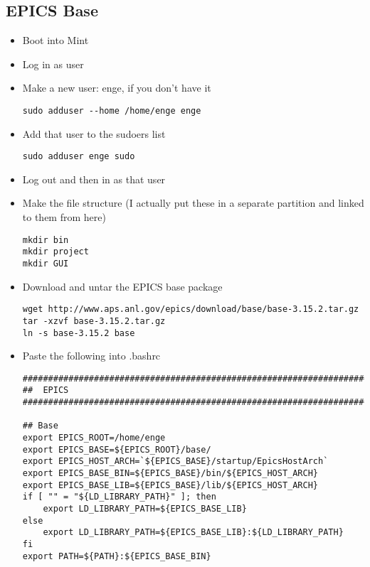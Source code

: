 \documentclass[11pt]{article}
\begin{document}
\subsection{EPICS Base}
\label{sec-1-2}
\begin{itemize}
\item Boot into Mint
\item Log in as user
\item Make a new user: enge, if you don't have it
\begin{verbatim}
sudo adduser --home /home/enge enge
\end{verbatim}
\item Add that user to the sudoers list
\begin{verbatim}
sudo adduser enge sudo
\end{verbatim}
\item Log out and then in as that user
\item Make the file structure (I actually put these in a separate
partition and linked to them from here)
\begin{verbatim}
mkdir bin
mkdir project
mkdir GUI
\end{verbatim}
\item Download and untar the EPICS base package
\begin{verbatim}
wget http://www.aps.anl.gov/epics/download/base/base-3.15.2.tar.gz 
tar -xzvf base-3.15.2.tar.gz
ln -s base-3.15.2 base
\end{verbatim}
\item Paste the following into .bashrc
\begin{verbatim}
######################################################################
##  EPICS
######################################################################

## Base
export EPICS_ROOT=/home/enge
export EPICS_BASE=${EPICS_ROOT}/base/
export EPICS_HOST_ARCH=`${EPICS_BASE}/startup/EpicsHostArch`
export EPICS_BASE_BIN=${EPICS_BASE}/bin/${EPICS_HOST_ARCH}
export EPICS_BASE_LIB=${EPICS_BASE}/lib/${EPICS_HOST_ARCH}
if [ "" = "${LD_LIBRARY_PATH}" ]; then
    export LD_LIBRARY_PATH=${EPICS_BASE_LIB}
else
    export LD_LIBRARY_PATH=${EPICS_BASE_LIB}:${LD_LIBRARY_PATH}
fi
export PATH=${PATH}:${EPICS_BASE_BIN}


\end{verbatim}
\end{itemize}
\end{document}
